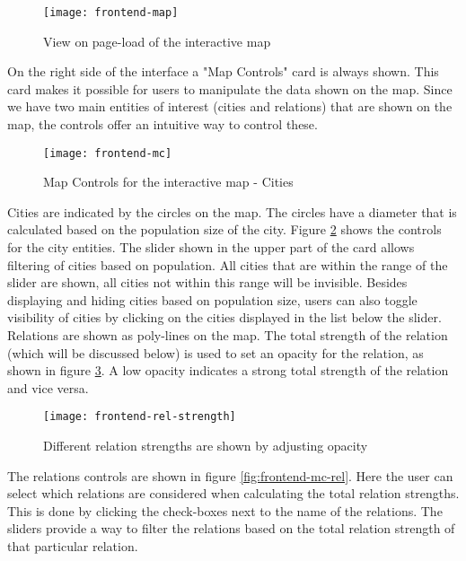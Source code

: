 \begin{figure}[H]
\centering
\texttt{[image: frontend-map]}
\caption{View on page-load of the interactive map}
\label{fig:frontend-map}
\end{figure}

On the right side of the interface a "Map Controls" card is always shown. This card makes it possible for users to manipulate the data shown on the map. Since we have two main entities of interest (cities and relations) that are shown on the map, the controls offer an intuitive way to control these.\\

\begin{figure}[H]
\centering
\texttt{[image: frontend-mc]}
\caption{Map Controls for the interactive map - Cities}
\label{fig:frontend-mc}
\end{figure}

Cities are indicated by the circles on the map. The circles have a diameter that is calculated based on the population size of the city. Figure \ref{fig:frontend-mc} shows the controls for the city entities. The slider shown in the upper part of the card allows filtering of cities based on population. All cities that are within the range of the slider are shown, all cities not within this range will be invisible. Besides displaying and hiding cities based on population size, users can also toggle visibility of cities by clicking on the cities displayed in the list below the slider.\\
Relations are shown as poly-lines on the map. The total strength of the relation (which will be discussed below) is used to set an opacity for the relation, as shown in figure \ref{fig:frontend-rel-strength}. A low opacity indicates a strong total strength of the relation and vice versa.

\begin{figure}[H]
\centering
\texttt{[image: frontend-rel-strength]}
\caption{Different relation strengths are shown by adjusting opacity}
\label{fig:frontend-rel-strength}
\end{figure}

The relations controls are shown in figure \ref{fig:frontend-mc-rel}. Here the user can select which relations are considered when calculating the total relation strengths. This is done by clicking the check-boxes next to the name of the relations. The sliders provide a way to filter the relations based on the total relation strength of that particular relation.\\

